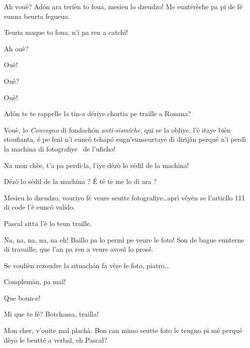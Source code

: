 \begin{drama}
\Bertinaspeaks Ah vouè? Adón ara terièn to foua, mesieu lo dzeudzo! Me euntérèche pa pi de fé eunna beurta fegueua.

\Tobiespeaks Teuria maque to foua, n’i pa ren a catchì!

\Bertinaspeaks Ah ouè?

\Tobiespeaks Ouè!

\Bertinaspeaks Ouè?

\Tobiespeaks Ouè!

\Bertinaspeaks Ad\'on te te rappelle la tin-a dériye chortia pe traille a Romma?

\Tobiespeaks Vouè, lo \textit{Convegno} di fondachón \textit{anti-sismiche}, qui se la obliye, l’è itaye bièn stoufianta, é pe fenì n’i eunc\'o tchap\'o eugn’eunseurtaye di dirijàn perqué n’i perdì la machina di fotografiye \macchinaFoto\ de l’uficho!

\Bertinaspeaks Na mon chèe, t’a pa perdi-la, l'iye dézò lo sédil de la machina!

\Tobiespeaks {} Dézò lo sédil de la machina ? É té te me lo di ara ?

\Bertinaspeaks Mesieu lo dzeudzo, vouriyo fé veure seutte fotografiye\ldots aprì véyèn se l’articllo 111 di code l’è eunc\'o valido.

\DzeudzoSenliquerspeaks Pascal sitta l’è lo teun traille.

\Tobiespeaks Na, na, na, na, na eh!  Baillo pa lo permì pe veure le foto! Son de bague eunterne di travaille, que l’an pa ren a veure avouì lo prosé.

\DzeudzoSenliquerspeaks Se voulièn rezoudre la situach\'on fa vère le foto, piatro\ldots



\DzeudzoSenliquerspeaks {} Complemàn, pa mal!

\Simonspeaks Que boun-e!

\Eumprezeospeaks Mi que te fé? Botchassa, trailla!

\DzeudzoSenliquerspeaks {} Mon cher, v'ouite mal plachà. Bon can mimo seutte foto le teugno pi mé perqué dèyo le beutté a verbal, eh Pascal?  \ok


\end{drama}

